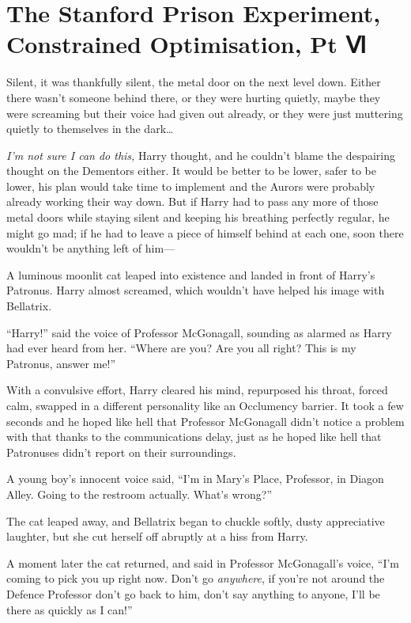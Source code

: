 \chapter{The Stanford Prison Experiment, Constrained Optimisation, Pt Ⅵ}

Silent, it was thankfully silent, the metal door on the next level down.
Either there wasn't someone behind there, or they were hurting quietly,
maybe they were screaming but their voice had given out already, or they
were just muttering quietly to themselves in the dark\ldots{}

\emph{I'm not sure I can do this,} Harry thought, and he couldn't blame
the despairing thought on the Dementors either. It would be better to be
lower, safer to be lower, his plan would take time to implement and the
Aurors were probably already working their way down. But if Harry had to
pass any more of those metal doors while staying silent and keeping his
breathing perfectly regular, he might go mad; if he had to leave a piece
of himself behind at each one, soon there wouldn't be anything left of
him---

A luminous moonlit cat leaped into existence and landed in front of
Harry's Patronus. Harry almost screamed, which wouldn't have helped his
image with Bellatrix.

``Harry!'' said the voice of Professor McGonagall, sounding as alarmed
as Harry had ever heard from her. ``Where are you? Are you all right?
This is my Patronus, answer me!''

With a convulsive effort, Harry cleared his mind, repurposed his throat,
forced calm, swapped in a different personality like an Occlumency
barrier. It took a few seconds and he hoped like hell that Professor
McGonagall didn't notice a problem with that thanks to the
communications delay, just as he hoped like hell that Patronuses didn't
report on their surroundings.

A young boy's innocent voice said, ``I'm in Mary's Place, Professor, in
Diagon Alley. Going to the restroom actually. What's wrong?''

The cat leaped away, and Bellatrix began to chuckle softly, dusty
appreciative laughter, but she cut herself off abruptly at a hiss from
Harry.

A moment later the cat returned, and said in Professor McGonagall's
voice, ``I'm coming to pick you up right now. Don't go \emph{anywhere},
if you're not around the Defence Professor don't go back to him, don't
say anything to anyone, I'll be there as quickly as I can!''

